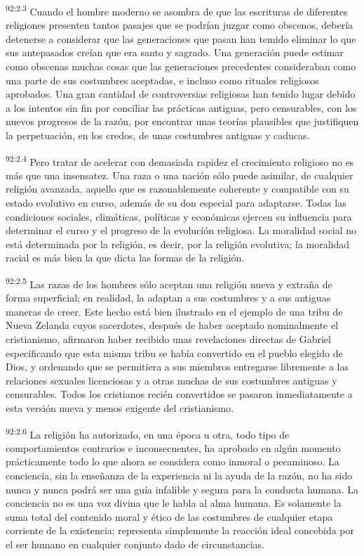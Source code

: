 \documentclass[twoside, 11pt]{book}
\begin{document}
\par
\textsuperscript{92:2.3} Cuando el hombre moderno se asombra de que las escrituras de diferentes religiones presenten tantos pasajes que se podrían juzgar como obscenos, debería detenerse a considerar que las generaciones que pasan han temido eliminar lo que sus antepasados creían que era santo y sagrado. Una generación puede estimar como obscenas muchas cosas que las generaciones precedentes consideraban como una parte de sus costumbres aceptadas, e incluso como rituales religiosos aprobados. Una gran cantidad de controversias religiosas han tenido lugar debido a los intentos sin fin por conciliar las prácticas antiguas, pero censurables, con los nuevos progresos de la razón, por encontrar unas teorías plausibles que justifiquen la perpetuación, en los credos, de unas costumbres antiguas y caducas.

\par
\textsuperscript{92:2.4} Pero tratar de acelerar con demasiada rapidez el crecimiento religioso no es más que una insensatez. Una raza o una nación sólo puede asimilar, de cualquier religión avanzada, aquello que es razonablemente coherente y compatible con su estado evolutivo en curso, además de su don especial para adaptarse. Todas las condiciones sociales, climáticas, políticas y económicas ejercen su influencia para determinar el curso y el progreso de la evolución religiosa. La moralidad social no está determinada por la religión, es decir, por la religión evolutiva; la moralidad racial es más bien la que dicta las formas de la religión.

\par
\textsuperscript{92:2.5} Las razas de los hombres sólo aceptan una religión nueva y extraña de forma superficial; en realidad, la adaptan a sus costumbres y a sus antiguas maneras de creer. Este hecho está bien ilustrado en el ejemplo de una tribu de Nueva Zelanda cuyos sacerdotes, después de haber aceptado nominalmente el cristianismo, afirmaron haber recibido unas revelaciones directas de Gabriel especificando que esta misma tribu se había convertido en el pueblo elegido de Dios, y ordenando que se permitiera a sus miembros entregarse libremente a las relaciones sexuales licenciosas y a otras muchas de sus costumbres antiguas y censurables. Todos los cristianos recién convertidos se pasaron inmediatamente a esta versión nueva y menos exigente del cristianismo.

\par
\textsuperscript{92:2.6} La religión ha autorizado, en una época u otra, todo tipo de comportamientos contrarios e inconsecuentes, ha aprobado en algún momento prácticamente todo lo que ahora se considera como inmoral o pecaminoso. La conciencia, sin la enseñanza de la experiencia ni la ayuda de la razón, no ha sido nunca y nunca podrá ser una guía infalible y segura para la conducta humana. La conciencia no es una voz divina que le habla al alma humana. Es solamente la suma total del contenido moral y ético de las costumbres de cualquier etapa corriente de la existencia; representa simplemente la reacción ideal concebida por el ser humano en cualquier conjunto dado de circunstancias.
\end{document}
